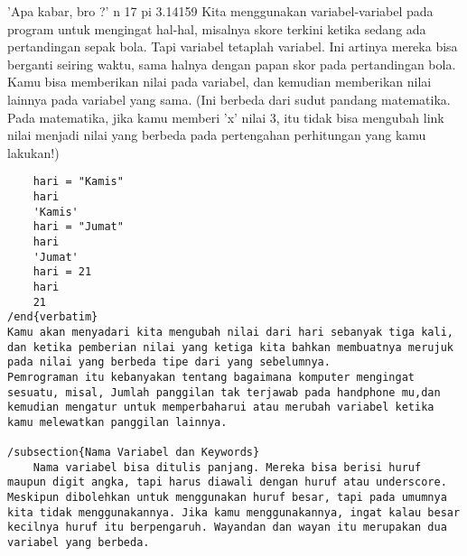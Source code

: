 'Apa kabar, bro ?' 
	n 
	17 
	pi  
	3.14159 
Kita menggunakan variabel-variabel pada program untuk mengingat hal-hal, misalnya skore terkini ketika sedang ada pertandingan sepak bola. Tapi variabel tetaplah variabel. Ini artinya mereka bisa berganti seiring waktu, sama halnya dengan papan skor pada pertandingan bola. Kamu bisa memberikan nilai pada variabel, dan kemudian memberikan nilai lainnya pada variabel yang sama. (Ini berbeda dari sudut pandang matematika. Pada matematika, jika kamu memberi 'x' nilai 3, itu tidak bisa mengubah link nilai menjadi nilai yang berbeda pada pertengahan perhitungan yang kamu lakukan!) 
\begin{verbatim}
	hari = "Kamis" 
	hari 
	'Kamis'
	hari = "Jumat" 
	hari 
	'Jumat' 
	hari = 21
	hari 
	21 
/end{verbatim}
Kamu akan menyadari kita mengubah nilai dari hari sebanyak tiga kali, dan ketika pemberian nilai yang ketiga kita bahkan membuatnya merujuk pada nilai yang berbeda tipe dari yang sebelumnya. 
Pemrograman itu kebanyakan tentang bagaimana komputer mengingat sesuatu, misal, Jumlah panggilan tak terjawab pada handphone mu,dan kemudian mengatur untuk memperbaharui atau merubah variabel ketika kamu melewatkan panggilan lainnya. 

/subsection{Nama Variabel dan Keywords}
	Nama variabel bisa ditulis panjang. Mereka bisa berisi huruf maupun digit angka, tapi harus diawali dengan huruf atau underscore. Meskipun dibolehkan untuk menggunakan huruf besar, tapi pada umumnya kita tidak menggunakannya. Jika kamu menggunakannya, ingat kalau besar kecilnya huruf itu berpengaruh. Wayandan dan wayan itu merupakan dua variabel yang berbeda.


\end{verbatim}
